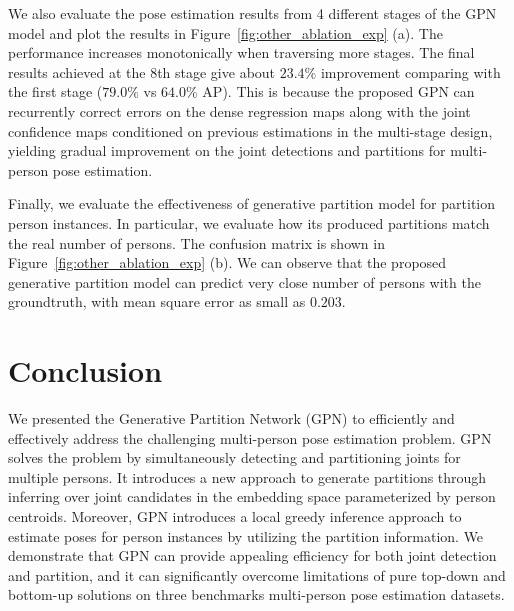 \documentclass[10pt,twocolumn,letterpaper]{article}
\begin{document}
We also evaluate the pose estimation results from 4 different stages of the GPN model and plot the results in Figure~\ref{fig:other_ablation_exp} (a).   The performance increases monotonically when traversing more stages. The final results achieved at the $8$th stage give about $23.4\%$ improvement comparing with the first stage ($79.0\%$ vs $64.0\%$ AP). This is because the proposed GPN can recurrently correct errors on the dense regression maps along with the joint confidence maps conditioned on previous estimations in the multi-stage design, yielding gradual improvement on the joint
detections and partitions for multi-person pose estimation.

Finally, we evaluate the effectiveness of generative partition model for partition  person instances. In particular, we evaluate how its produced partitions match the real number of persons. The confusion matrix is shown in Figure~\ref{fig:other_ablation_exp} (b). We can observe that the proposed generative partition model can predict very close number of persons with the groundtruth, with   mean square error as small as $0.203$.

\section{Conclusion}

We  presented the Generative Partition Network (GPN) to efficiently and effectively address the challenging multi-person pose estimation problem. GPN solves the problem by simultaneously detecting and partitioning joints for multiple persons. It introduces a new approach to generate partitions through inferring over joint candidates in the  embedding space parameterized by person centroids. Moreover, GPN introduces a local greedy inference approach to estimate poses for person instances by utilizing the partition information. We demonstrate that GPN can provide appealing efficiency for both joint detection and  partition, and it can significantly overcome limitations of pure top-down and bottom-up solutions on three benchmarks multi-person pose estimation datasets.



{\small


}
\end{document}
